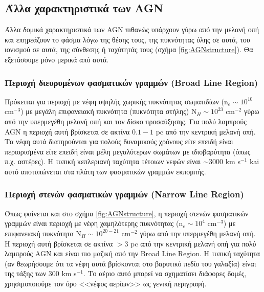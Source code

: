 \subsection{Άλλα χαρακτηριστικά των \textlatin{AGN}}

Άλλα δομικά χαρακτηριστικά των \textlatin{AGN} πιθανώς υπάρχουν γύρω από την μελανή οπή και επηρεάζουν το φάσμα λόγω της θέσης τους, της πυκνότητας ύλης σε αυτά, του ιονισμού σε αυτά, της σύνθεσης ή ταχύτητάς τους (σχήμα \ref{fig:AGNstructure}). Θα εξετάσουμε μόνο μερικά από αυτά. 

\subsubsection*{Περιοχή διευρυμένων φασματικών γραμμών \textlatin{(Broad Line Region)}}
Πρόκειται για περιοχή με νέφη υψηλής χωρικής πυκνότητας σωματιδίων (\textlatin{n}$_{e} \sim 10^{10}$ \textlatin{cm}$^{-3}$) με μεγάλη επιφανειακή πυκνότητα (πυκνότητα στήλης) Ν$_{Η} \sim 10^{23}$ \textlatin{cm}$^{-2}$ γύρω από την υπερμεγέθη μελανή οπή και τον δίσκο προσαύξησης. Για πολύ λαμπρούς \textlatin{AGN} η περιοχή αυτή βρίσκεται σε ακτίνα $0.1-1$ \textlatin{pc} από την κεντρική μελανή οπή. Τα νέφη αυτά διατηρούνται για πολούς δυναμικούς χρόνους είτε επειδή είναι περιορισμένα είτε επειδή είναι μέλη μεγαλύτερων σωμάτων με ιδιοβαρύτητα (όπως π.χ. αστέρες). Η τυπική κεπλεριανή ταχύτητα τέτοιων νεφών είναι $ \sim 3000$ \textlatin{km s}$^{-1}$ kai αυτό αποτυπώνεται στα πλάτη των φασματικών γραμμών εκπομπής\cite{netzer_2013}.

\subsubsection*{Περιοχή στενών φασματικών γραμμών \textlatin{(Narrow Line Region)}}

Όπως φαίνεται και στο σχήμα \ref{fig:AGNstructure}, η περιοχή στενών φασματικών γραμμών είναι περιοχή με νέφη χαμηλότερης πυκνότητας (\textlatin{n}$_{e} \sim 10^{4}$ \textlatin{cm}$^{-3}$) με επιφανειακή πυκνότητα Ν$_{Η} \sim 10^{20-21}$ \textlatin{cm}$^{-2}$ γύρω από την υπερμεγέθη μελανή οπή. Η περιοχή αυτή βρίσκεται σε ακτίνα $> 3$ \textlatin{pc} από την κεντρική μελανή οπή για πολύ λαμπρούς \textlatin{AGN} και είναι πιο μαζική από την \textlatin{Broad Line Region}. Η τυπική ταχύτητα (αν θεωρήσουμε ότι τα νέφη αυτά βρίσκονται στο βαρυτικό πεδίο του γαλαξία) είναι της τάξης των $300$ \textlatin{km s}$^{-1}$. Το αέριο αυτό μπορεί να σχηματίσει διάφορες δομές, χρησιμοποιούμε τον όρο <<νέφος αερίων>> ως γενική περιγραφή\cite{netzer_2013}. 


